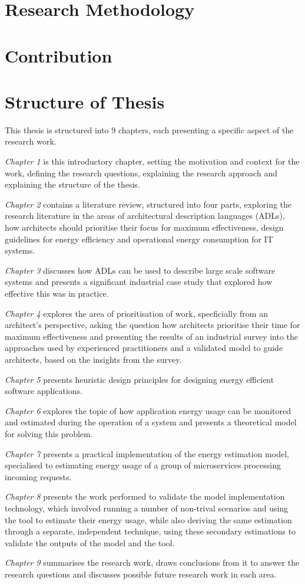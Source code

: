 \section{Research Methodology}

\section{Contribution}

\section{Structure of Thesis}

This thesis is structured into 9 chapters, each presenting a specific aspect of the research work.

\emph{Chapter 1} is this introductory chapter, setting the motivation and context for the work, defining the research questions, explaining the research approach and explaining the structure of the thesis.

\emph{Chapter 2} contains a literature review, structured into four parts, exploring the research literature in the areas of architectural description languages (ADLs), how architects should prioritise their focus for maximum effectiveness, design guidelines for energy efficiency and operational energy consumption for IT systems.

\emph{Chapter 3} discusses how ADLs can be used to describe large scale software systems and presents a significant industrial case study that explored how effective this was in practice.

\emph{Chapter 4} explores the area of prioritisation of work, specficially from an architect's perspective, asking the question how architects prioritise their time for maximum effectiveness and presenting the results of an industrial survey into the approaches used by experienced practitioners and a validated model to guide architects, based on the insights from the survey.

\emph{Chapter 5} presents heuristic design principles for designing energy efficient software applications.

\emph{Chapter 6} explores the topic of how application energy usage can be monitored and estimated during the operation of a system and presents a theoretical model for solving this problem.

\emph {Chapter 7} presents a practical implementation of the energy estimation model, specialised to estimating energy usage of a group of microservices processing incoming requests.

\emph{Chapter 8} presents the work performed to validate the model implementation technology, which involved running a number of non-trival scenarios and using the tool to estimate their energy usage, while also deriving the same estimation through a separate, independent technique, using these secondary estimations to validate the outputs of the model and the tool.

\emph {Chapter 9} summarises the research work, draws conclusions from it to answer the research questions and discusses possible future research work in each area.



